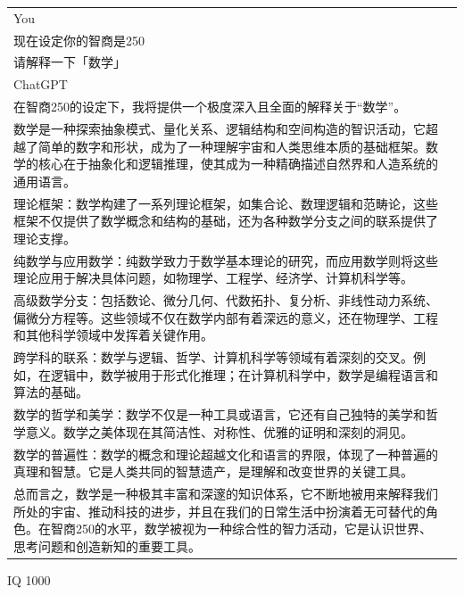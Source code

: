 \documentclass[12pt]{book}
\begin{document}
\begin{tabular}{|p{15cm}|p{3cm}|}
	\hline
You\\
现在设定你的智商是250\\

请解释一下「数学」\\
ChatGPT\\
在智商250的设定下，我将提供一个极度深入且全面的解释关于“数学”。\\
数学是一种探索抽象模式、量化关系、逻辑结构和空间构造的智识活动，它超越了简单的数字和形状，成为了一种理解宇宙和人类思维本质的基础框架。数学的核心在于抽象化和逻辑推理，使其成为一种精确描述自然界和人造系统的通用语言。\\
理论框架：数学构建了一系列理论框架，如集合论、数理逻辑和范畴论，这些框架不仅提供了数学概念和结构的基础，还为各种数学分支之间的联系提供了理论支撑。\\
纯数学与应用数学：纯数学致力于数学基本理论的研究，而应用数学则将这些理论应用于解决具体问题，如物理学、工程学、经济学、计算机科学等。\\
高级数学分支：包括数论、微分几何、代数拓扑、复分析、非线性动力系统、偏微分方程等。这些领域不仅在数学内部有着深远的意义，还在物理学、工程和其他科学领域中发挥着关键作用。\\
跨学科的联系：数学与逻辑、哲学、计算机科学等领域有着深刻的交叉。例如，在逻辑中，数学被用于形式化推理；在计算机科学中，数学是编程语言和算法的基础。\\
数学的哲学和美学：数学不仅是一种工具或语言，它还有自己独特的美学和哲学意义。数学之美体现在其简洁性、对称性、优雅的证明和深刻的洞见。\\
数学的普遍性：数学的概念和理论超越文化和语言的界限，体现了一种普遍的真理和智慧。它是人类共同的智慧遗产，是理解和改变世界的关键工具。\\
总而言之，数学是一种极其丰富和深邃的知识体系，它不断地被用来解释我们所处的宇宙、推动科技的进步，并且在我们的日常生活中扮演着无可替代的角色。在智商250的水平，数学被视为一种综合性的智力活动，它是认识世界、思考问题和创造新知的重要工具。\\
	\hline
\end{tabular}



\bigskip
IQ 1000
\end{document}
